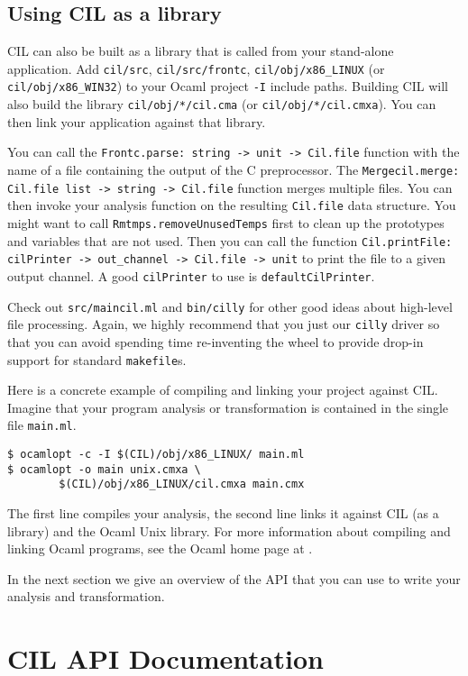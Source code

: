 \documentclass{article}
\def\t#1{{\tt #1}}
\begin{document}
\subsection{Using CIL as a library}

CIL can also be built as a library that is called from your stand-alone
application. Add \t{cil/src}, \t{cil/src/frontc}, \t{cil/obj/x86\_LINUX}
(or \t{cil/obj/x86\_WIN32}) to your Ocaml project \t{-I} include paths.
Building CIL will also build the library \t{cil/obj/*/cil.cma} (or
\t{cil/obj/*/cil.cmxa}). You can then link your application against that
library. 

You can call the \t{Frontc.parse: string -> unit -> Cil.file} function with
the name of a file containing the output of the C preprocessor.
The \t{Mergecil.merge: Cil.file list -> string -> Cil.file} function merges
multiple files. You can then invoke your analysis function on the resulting
\t{Cil.file} data structure.  You might want to call
\t{Rmtmps.removeUnusedTemps} first to clean up the prototypes and variables
that are not used. Then you can call the function \t{Cil.printFile:
cilPrinter -> out\_channel -> Cil.file -> unit} to print the file to a
given output channel. A good \t{cilPrinter} to use is
\t{defaultCilPrinter}. 

Check out \t{src/maincil.ml} and \t{bin/cilly} for other good ideas
about high-level file processing. Again, we highly recommend that you just
our \t{cilly} driver so that you can avoid spending time re-inventing the
wheel to provide drop-in support for standard \t{makefile}s. 

Here is a concrete example of compiling and linking your project against
CIL. Imagine that your program analysis or transformation is contained in
the single file \t{main.ml}. 

\begin{verbatim}
$ ocamlopt -c -I $(CIL)/obj/x86_LINUX/ main.ml
$ ocamlopt -o main unix.cmxa \ 
        $(CIL)/obj/x86_LINUX/cil.cmxa main.cmx
\end{verbatim}

The first line compiles your analysis, the second line links it against CIL
(as a library) and the Ocaml Unix library. For more information about
compiling and linking Ocaml programs, see the Ocaml home page
at . 

In the next section we give an overview of the API that you can use
to write your analysis and transformation. 
 
\section{CIL API Documentation}\label{sec-api} 
\end{document}
